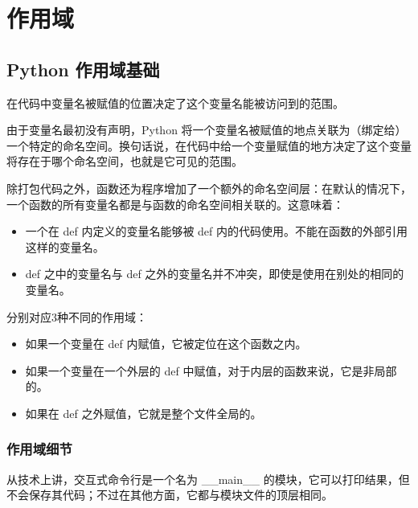 \chapter{作用域\label{ch17}}
\section{Python 作用域基础}
在代码中变量名被赋值的位置决定了这个变量名能被访问到的范围。

由于变量名最初没有声明，Python 将一个变量名被赋值的地点关联为（绑定给）一个特定的命名空间。换句话说，在代码中给一个变量赋值的地方决定了这个变量将存在于哪个命名空间，也就是它可见的范围。

除打包代码之外，函数还为程序增加了一个额外的命名空间层：在默认的情况下，一个函数的所有变量名都是与函数的命名空间相关联的。这意味着：
\begin{itemize}
    \item 一个在 def 内定义的变量名能够被 def 内的代码使用。不能在函数的外部引用这样的变量名。
    \item def 之中的变量名与 def 之外的变量名并不冲突，即使是使用在别处的相同的变量名。
\end{itemize}

分别对应3种不同的作用域：
\begin{itemize}
    \item 如果一个变量在 def 内赋值，它被定位在这个函数之内。
    \item 如果一个变量在一个外层的 def 中赋值，对于内层的函数来说，它是非局部的。
    \item 如果在 def 之外赋值，它就是整个文件全局的。
\end{itemize}
\subsection{作用域细节}
从技术上讲，交互式命令行是一个名为 \_\_main\_\_ 的模块，它可以打印结果，但不会保存其代码；不过在其他方面，它都与模块文件的顶层相同。

